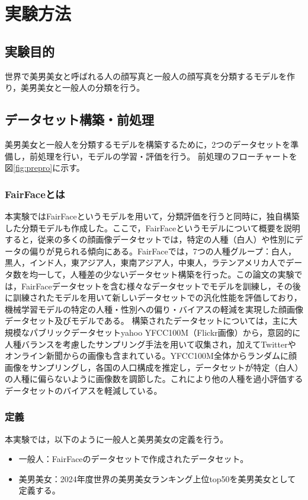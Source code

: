 \documentclass[a4paper,11pt,titlepage]{jsarticle}
\begin{document}
\section{実験方法}
\label{label:実験方法}
\subsection{実験目的}
世界で美男美女と呼ばれる人の顔写真と一般人の顔写真を分類するモデルを作り，美男美女と一般人の分類を行う。

\subsection{データセット構築・前処理}
美男美女と一般人を分類するモデルを構築するために，2つのデータセットを準備し，前処理を行い，モデルの学習・評価を行う。
前処理のフローチャートを図\ref{fig:prepro}に示す。


\subsubsection{FairFaceとは}
本実験ではFairFaceというモデルを用いて，分類評価を行うと同時に，独自構築した分類モデルも作成した。ここで，FairFaceというモデルについて概要を説明すると，従来の多くの顔画像データセットでは，特定の人種（白人）や性別にデータの偏りが見られる傾向にある。FairFaceでは，7つの人種グループ：白人，黒人，インド人，東アジア人，東南アジア人，中東人，ラテンアメリカ人でデータ数を均一して，人種差の少ないデータセット構築を行った。この論文の実験では，FairFaceデータセットを含む様々なデータセットでモデルを訓練し，その後に訓練されたモデルを用いて新しいデータセットでの汎化性能を評価しており，機械学習モデルの特定の人種・性別への偏り・バイアスの軽減を実現した顔画像データセット及びモデルである。
構築されたデータセットについては，主に大規模なパブリックデータセットyahoo YFCC100M（Flickr画像）から，意図的に人種バランスを考慮したサンプリング手法を用いて収集され，加えてTwitterやオンライン新聞からの画像も含まれている。YFCC100M全体からランダムに顔画像をサンプリングし，各国の人口構成を推定し，データセットが特定（白人）の人種に偏らないように画像数を調節した。これにより他の人種を過小評価するデータセットのバイアスを軽減している。




\subsubsection{定義}
本実験では，以下のように一般人と美男美女の定義を行う。
\begin{itemize}
    \item 一般人：FairFaceのデータセットで作成されたデータセット。
    \item 美男美女：2024年度世界の美男美女ランキング上位top50を美男美女として定義する。
\end{itemize}
\end{document}
